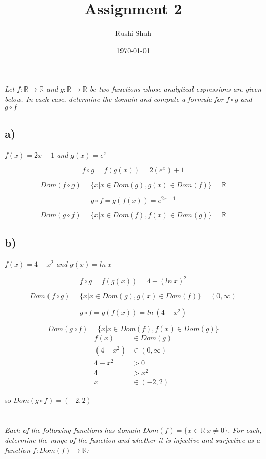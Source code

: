 \documentclass[]{article}
\author{Rushi Shah}
\date{\today}
\title{Assignment 2}
\newcommand{\reals}{\mathbb{R}}
\begin{document}
	\maketitle

	\section{}
		\textit{Let $f : \reals \rightarrow \reals$ and $g : \reals \rightarrow \reals$ be two functions whose analytical expressions are given below. In each case, determine the domain and compute a formula for $f \circ g$ and $g \circ f$}
		\subsection*{a)}
			\textit{$f(x) = 2x + 1$ and $g(x) = e^x$}

			\[f \circ g = f(g(x)) = 2(e^x) + 1\]

			\[Dom(f \circ g) = \{x | x \in Dom(g), g(x) \in Dom(f)\} = \reals\]

			\[g \circ f = g(f(x)) = e^{2x+1}\]

			\[Dom(g \circ f) = \{x | x \in Dom(f), f(x) \in Dom(g)\} = \reals\]

		\subsection*{b)}
			\textit{$f(x) = 4 - x^2$ and $g(x) = ln\ x$}

			\[f \circ g = f(g(x)) = 4 - (ln\ x)^2\]

			\[Dom(f \circ g) = \{x | x \in Dom(g), g(x) \in Dom(f)\} = (0, \infty)\]

			\[g \circ f = g(f(x)) = ln\ (4 - x^2)\]

			\[Dom(g \circ f) = \{x | x \in Dom(f), f(x) \in Dom(g)\}\]
			\begin{align*}
				f(x) &\in Dom(g) \\ 
				(4 - x^2) &\in (0, \infty) \\
				4 - x^2 &> 0 \\
				4 &> x^2 \\ 
				x &\in (-2, 2)
			\end{align*}

			so $Dom(g \circ f) = (-2, 2)$

	\section{}
		\textit{Each of the following functions has domain $Dom(f) = \{x \in \reals | x \neq 0\}$. For each, determine the range of the function and whether it is injective and surjective as a function $f : Dom(f) \mapsto \reals$:}
\end{document}
